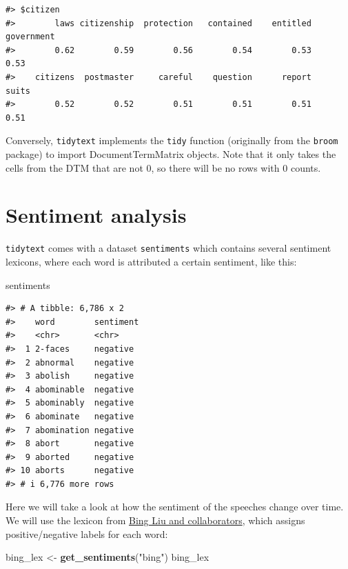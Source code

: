 \documentclass[
]{book}
\newenvironment{Shaded}{\begin{snugshade}}{\end{snugshade}}
\newcommand{\FunctionTok}[1]{\textcolor[rgb]{0.13,0.29,0.53}{\textbf{#1}}}
\newcommand{\NormalTok}[1]{#1}
\newcommand{\OtherTok}[1]{\textcolor[rgb]{0.56,0.35,0.01}{#1}}
\newcommand{\StringTok}[1]{\textcolor[rgb]{0.31,0.60,0.02}{#1}}
\begin{document}
\begin{verbatim}
#> $citizen
#>        laws citizenship  protection   contained    entitled  government 
#>        0.62        0.59        0.56        0.54        0.53        0.53 
#>    citizens  postmaster     careful    question      report       suits 
#>        0.52        0.52        0.51        0.51        0.51        0.51
\end{verbatim}

Conversely, \texttt{tidytext} implements the \texttt{tidy} function (originally from the \texttt{broom} package) to import DocumentTermMatrix objects. Note that it only takes the cells from the DTM that are not 0, so there will be no rows with 0 counts.

\section{Sentiment analysis}\label{sentiment-analysis}

\texttt{tidytext} comes with a dataset \texttt{sentiments} which contains several sentiment lexicons, where each word is attributed a certain sentiment, like this:

\begin{Shaded}
\begin{Highlighting}[]
\NormalTok{sentiments}
\end{Highlighting}
\end{Shaded}

\begin{verbatim}
#> # A tibble: 6,786 x 2
#>    word        sentiment
#>    <chr>       <chr>    
#>  1 2-faces     negative 
#>  2 abnormal    negative 
#>  3 abolish     negative 
#>  4 abominable  negative 
#>  5 abominably  negative 
#>  6 abominate   negative 
#>  7 abomination negative 
#>  8 abort       negative 
#>  9 aborted     negative 
#> 10 aborts      negative 
#> # i 6,776 more rows
\end{verbatim}

Here we will take a look at how the sentiment of the speeches change over time. We will use the lexicon from \href{https://www.cs.uic.edu/~liub/FBS/sentiment-analysis.html}{Bing Liu and collaborators}, which assigns positive/negative labels for each word:

\begin{Shaded}
\begin{Highlighting}[]
\NormalTok{bing\_lex }\OtherTok{\textless{}{-}} \FunctionTok{get\_sentiments}\NormalTok{(}\StringTok{"bing"}\NormalTok{)}
\NormalTok{bing\_lex}
\end{Highlighting}
\end{Shaded}
\end{document}
